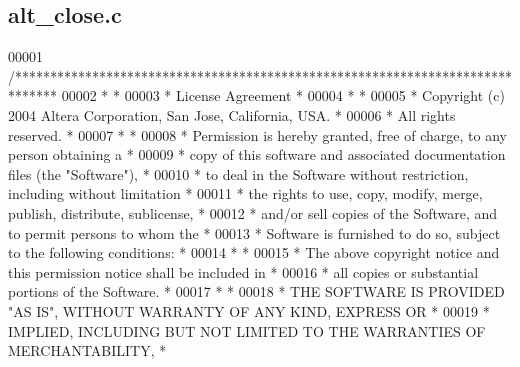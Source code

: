\subsection{alt\+\_\+close.\+c}
\label{alt__close_8c_source}

\begin{DoxyCode}
00001 \textcolor{comment}{/******************************************************************************}
00002 \textcolor{comment}{*                                                                             *}
00003 \textcolor{comment}{* License Agreement                                                           *}
00004 \textcolor{comment}{*                                                                             *}
00005 \textcolor{comment}{* Copyright (c) 2004 Altera Corporation, San Jose, California, USA.           *}
00006 \textcolor{comment}{* All rights reserved.                                                        *}
00007 \textcolor{comment}{*                                                                             *}
00008 \textcolor{comment}{* Permission is hereby granted, free of charge, to any person obtaining a     *}
00009 \textcolor{comment}{* copy of this software and associated documentation files (the "Software"),  *}
00010 \textcolor{comment}{* to deal in the Software without restriction, including without limitation   *}
00011 \textcolor{comment}{* the rights to use, copy, modify, merge, publish, distribute, sublicense,    *}
00012 \textcolor{comment}{* and/or sell copies of the Software, and to permit persons to whom the       *}
00013 \textcolor{comment}{* Software is furnished to do so, subject to the following conditions:        *}
00014 \textcolor{comment}{*                                                                             *}
00015 \textcolor{comment}{* The above copyright notice and this permission notice shall be included in  *}
00016 \textcolor{comment}{* all copies or substantial portions of the Software.                         *}
00017 \textcolor{comment}{*                                                                             *}
00018 \textcolor{comment}{* THE SOFTWARE IS PROVIDED "AS IS", WITHOUT WARRANTY OF ANY KIND, EXPRESS OR  *}
00019 \textcolor{comment}{* IMPLIED, INCLUDING BUT NOT LIMITED TO THE WARRANTIES OF MERCHANTABILITY,    *}

\end{DoxyCode}

